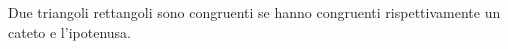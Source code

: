 Due triangoli rettangoli sono congruenti se hanno 
congruenti rispettivamente un cateto e l'ipotenusa. %